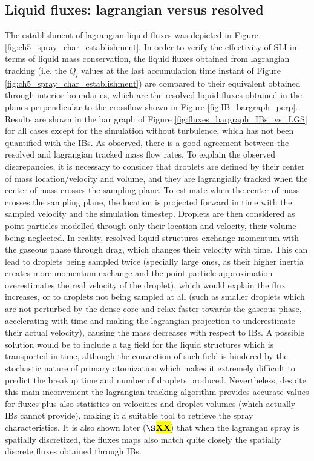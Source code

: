\subsection{Liquid fluxes: lagrangian versus resolved}
\label{subsec:ch5_sli_fluxes_vs_IBs}

The establishment of lagrangian liquid fluxes was depicted in Figure \ref{fig:ch5_spray_char_establishment}. In order to verify the effectivity of SLI in terms of liquid mass conservation, the liquid fluxes obtained from lagrangian tracking (i.e. the $Q_l$ values at the last accumulation time instant of Figure \ref{fig:ch5_spray_char_establishment}) are compared to their equivalent obtained through interior boundaries, which are the resolved liquid fluxes obtained in the planes perpendicular to the crossflow shown in Figure \ref{fig:IB_bargraph_perp}. Results are shown in the bar graph of Figure \ref{fig:fluxes_bargraph_IBs_vs_LGS} for all cases except for the simulation without turbulence, which has not been quantified with the IBs. As observed, there is a good agreement between the resolved and lagrangian tracked mass flow rates. To explain the observed discrepancies, it is necessary to consider that droplets are defined by their center of mass location/velocity and volume, and they are lagrangially tracked when the center of mass crosses the sampling plane. To estimate when the center of mass crosses the sampling plane, the location is projected forward in time with the sampled velocity and the simulation timestep. Droplets are then considered as point particles modelled through only their location and velocity, their volume being neglected. In reality, resolved liquid structures exchange momentum with the gaseous phase through drag, which changes their velocity with time. This can lead to droplets being sampled twice (specially large ones, as their higher inertia creates more momentum exchange and the point-particle approximation overestimates the real velocity of the droplet), which would explain the flux increases, or to droplets not being sampled at all (such as smaller droplets which are not perturbed by the dense core and relax faster towards the gaseous phase, accelerating with time and making the lagrangian projection to underestimate their actual velocity), causing the mass decreases with respect to IBs. A possible solution would be to include a tag field for the liquid structures which is transported in time, although the convection of such field is hindered by the stochastic nature of primary atomization which makes it extremely difficult to predict the breakup time and number of droplets produced. Nevertheless, despite this main inconvenient the lagrangian tracking algorithm provides accurate values for fluxes plus also statistics on velocities and droplet volumes (which actually IBs cannot provide), making it a suitable tool to retrieve the spray characteristics. It is also shown later ($\S$\hl{\textbf{XX}}) that when the lagrangan spray is spatially discretized, the fluxes maps also match quite closely the spatially discrete fluxes obtained through IBs.




